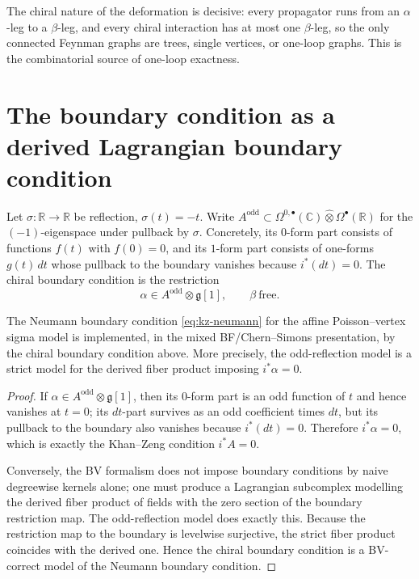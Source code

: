 \begin{remark}
The chiral nature of the deformation is decisive:
every propagator runs from an $\alpha$-leg to a $\beta$-leg, and every chiral interaction
has at most one $\beta$-leg, so the only connected Feynman graphs are trees,
single vertices, or one-loop graphs. This is the combinatorial source of one-loop exactness.
\end{remark}

\section{The boundary condition as a derived Lagrangian boundary condition}

\begin{definition}
Let $\sigma\colon \mathbb R \to \mathbb R$ be reflection, $\sigma(t)=-t$.
Write $A^{\mathrm{odd}} \subset \Omega^{0,\bullet}(\mathbb C)\widehat\otimes\Omega^{\bullet}(\mathbb R)$
for the $(-1)$-eigenspace under pullback by $\sigma$.
Concretely, its $0$-form part consists of functions $f(t)$ with $f(0)=0$, and its $1$-form part consists
of one-forms $g(t)\,dt$ whose pullback to the boundary vanishes because $i^*(dt)=0$.
The chiral boundary condition is the restriction
\[
\alpha \in A^{\mathrm{odd}}\otimes \mathfrak g[1],
\qquad
\beta\ \text{free}.
\]
\end{definition}

\begin{proposition}\label{prop:boundary-condition-equivalence}
The Neumann boundary condition \eqref{eq:kz-neumann} for the affine Poisson--vertex sigma model is
implemented, in the mixed BF/Chern--Simons presentation, by the chiral boundary condition above.
More precisely, the odd-reflection model is a strict model for the derived fiber product imposing
$i^*\alpha=0$.
\end{proposition}

\begin{proof}
If $\alpha \in A^{\mathrm{odd}}\otimes \mathfrak g[1]$, then its $0$-form part is an odd function of $t$ and hence
vanishes at $t=0$; its $dt$-part survives as an odd coefficient times $dt$, but its pullback to the boundary
also vanishes because $i^*(dt)=0$. Therefore $i^*\alpha=0$, which is exactly the Khan--Zeng condition
$i^*A=0$.

Conversely, the BV formalism does not impose boundary conditions by naive degreewise kernels alone; one must
produce a Lagrangian subcomplex modelling the derived fiber product of fields with the zero section of the boundary
restriction map. The odd-reflection model does exactly this. Because the restriction map to the boundary is
levelwise surjective, the strict fiber product coincides with the derived one. Hence the chiral boundary condition
is a BV-correct model of the Neumann boundary condition.
\end{proof}


